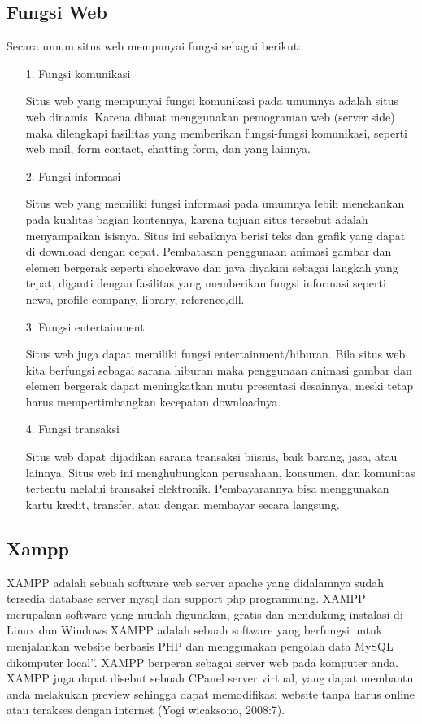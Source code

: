 \documentclass{jtetiproposalskripsi}
\begin{document}
\subsection{Fungsi Web }
Secara umum situs web mempunyai fungsi sebagai berikut:

\begin{itemize}
\item[1.] Fungsi komunikasi 

Situs web yang mempunyai fungsi komunikasi pada umumnya adalah situs web dinamis. Karena dibuat menggunakan pemograman web (server side) maka dilengkapi fasilitas yang memberikan fungsi-fungsi komunikasi, seperti web mail, form contact, chatting form, dan yang lainnya.


\item[2.] Fungsi informasi  

Situs web yang memiliki fungsi informasi pada umumnya lebih menekankan pada kualitas bagian kontennya, karena tujuan situs tersebut adalah menyampaikan isisnya. Situs ini sebaiknya berisi teks dan grafik yang dapat di download dengan cepat. Pembatasan penggunaan animasi gambar dan elemen bergerak seperti shockwave dan java diyakini sebagai langkah yang tepat, diganti dengan fasilitas yang memberikan fungsi informasi seperti news, profile company, library, reference,dll.

\item[3.]Fungsi entertainment 

Situs web juga dapat memiliki fungsi entertainment/hiburan. Bila situs web kita berfungsi sebagai sarana hiburan maka penggunaan animasi gambar dan elemen bergerak dapat meningkatkan mutu presentasi desainnya, meski tetap harus mempertimbangkan kecepatan downloadnya.

\item[4.] Fungsi transaksi 

Situs web dapat dijadikan sarana transaksi biisnis, baik barang, jasa, atau lainnya. Situs web ini menghubungkan perusahaan, konsumen, dan komunitas tertentu melalui transaksi elektronik. Pembayarannya bisa menggunakan kartu kredit, transfer, atau dengan membayar secara langsung.

\end{itemize}

\subsection{Xampp}
XAMPP adalah sebuah software web server apache yang didalamnya sudah tersedia database server mysql dan support php programming. XAMPP merupakan software yang mudah digunakan, gratis dan mendukung instalasi di Linux dan Windows
 XAMPP adalah sebuah software yang berfungsi untuk menjalankan website berbasis PHP dan menggunakan pengolah data MySQL dikomputer local”.  XAMPP berperan sebagai server web pada komputer anda. XAMPP juga dapat disebut sebuah CPanel server virtual, yang dapat membantu anda melakukan preview sehingga dapat memodifikasi website tanpa harus online atau terakses dengan internet (Yogi wicaksono, 2008:7).
\end{document}
